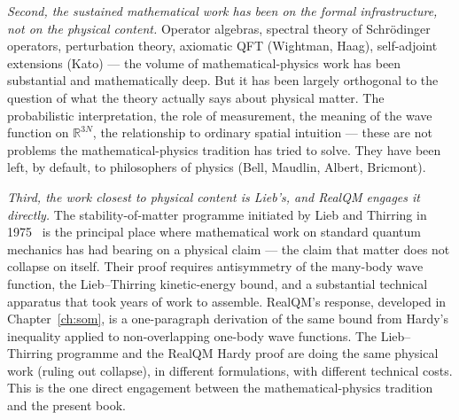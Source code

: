 \emph{Second, the sustained mathematical work has been on the formal infrastructure, not on the physical content.} Operator algebras, spectral theory of Schr\"odinger operators, perturbation theory, axiomatic QFT (Wightman, Haag), self-adjoint extensions (Kato) --- the volume of mathematical-physics work has been substantial and mathematically deep. But it has been largely orthogonal to the question of what the theory actually says about physical matter. The probabilistic interpretation, the role of measurement, the meaning of the wave function on $\mathbb{R}^{3N}$, the relationship to ordinary spatial intuition --- these are not problems the mathematical-physics tradition has tried to solve. They have been left, by default, to philosophers of physics (Bell, Maudlin, Albert, Bricmont).

\emph{Third, the work closest to physical content is Lieb's, and RealQM engages it directly.} The stability-of-matter programme initiated by Lieb and Thirring in 1975~\cite{LiebThirring1975} is the principal place where mathematical work on standard quantum mechanics has had bearing on a physical claim --- the claim that matter does not collapse on itself. Their proof requires antisymmetry of the many-body wave function, the Lieb--Thirring kinetic-energy bound, and a substantial technical apparatus that took years of work to assemble. RealQM's response, developed in Chapter~\ref{ch:som}, is a one-paragraph derivation of the same bound from Hardy's inequality applied to non-overlapping one-body wave functions. The Lieb--Thirring programme and the RealQM Hardy proof are doing the same physical work (ruling out collapse), in different formulations, with different technical costs. This is the one direct engagement between the mathematical-physics tradition and the present book.


